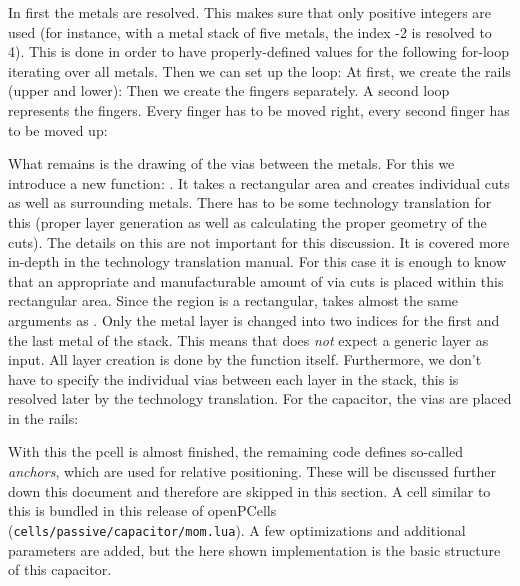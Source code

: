 In  first the metals are resolved.
This makes sure that only positive integers are used (for instance, with a metal stack of five metals, the index -2 is resolved to 4).
This is done in order to have properly-defined values for the following for-loop iterating over all metals.
Then we can set up the loop:
At first, we create the rails (upper and lower):
Then we create the fingers separately.
A second loop represents the fingers.
Every finger has to be moved right, every second finger has to be moved up:

What remains is the drawing of the vias between the metals.
For this we introduce a new  function: .
It takes a rectangular area and creates individual cuts as well as surrounding metals.
There has to be some technology translation for this (proper layer generation as well as calculating the proper geometry of the cuts).
The details on this are not important for this discussion.
It is covered more in-depth in the technology translation manual.
For this case it is enough to know that an appropriate and manufacturable amount of via cuts is placed within this rectangular area.
Since the region is a rectangular,  takes almost the same arguments as .
Only the metal layer is changed into two indices for the first and the last metal of the stack.
This means that  does \emph{not} expect a generic layer as input.
All layer creation is done by the function itself.
Furthermore, we don't have to specify the individual vias between each layer in the stack, this is resolved later by the technology translation.
For the capacitor, the vias are placed in the rails:

With this the pcell is almost finished, the remaining code defines so-called \emph{anchors}, which are used for relative positioning.
These will be discussed further down this document and therefore are skipped in this section.
A cell similar to this is bundled in this release of openPCells (\texttt{cells/passive/capacitor/mom.lua}).
A few optimizations and additional parameters are added, but the here shown implementation is the basic structure of this capacitor.

